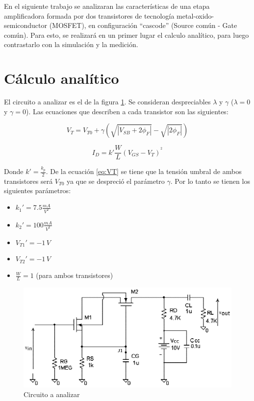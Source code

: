 \documentclass[10pt,spanish,a4paper,notitlepage]{article}
\begin{document}
En el siguiente trabajo se analizaran las características de una etapa amplificadora formada por dos transistores de tecnología metal-oxido-semiconductor (MOSFET), en configuración ``cascode'' (Source común - Gate común). Para esto, se realizará en un primer lugar el calculo analítico, para luego contrastarlo con la simulación y la medición.

\section{Cálculo analítico}

El circuito a analizar es el de la figura \ref{fig:circuitototal}. Se consideran despreciables $\lambda$ y $\gamma$ ($\lambda = 0$ y $\gamma = 0$). Las ecuaciones que describen a cada transistor son las siguientes:

\begin{equation}
     V_T=V_{T0}+\gamma \left( \sqrt{ | V_{SB}+2\phi_{F} | } - \sqrt{|2\phi_{F}|} \right)
    \label{eq:VT}
\end{equation}

\begin{equation}
    I_D={k}' \frac{W}{L} \left ( V_{GS}-V_{T} \right )^{^{2}}
    \label{eq:ID}
\end{equation}

Donde ${k}'=\frac{k_p}{2}$. De la ecuación \ref{eq:VT} se tiene que la tensión umbral de ambos transistores será $V_{T0}$ ya que se despreció el parámetro $\gamma$. Por lo tanto se tienen los siguientes parámetros:

\begin{itemize}
\item ${k_1}'=7.5\unit{\frac{mA}{V^2}}$
\item ${k_2}'=100\unit{\frac{mA}{V^2}}$
\item ${V_{T1}}'= -1\,\unit{V}$
\item ${V_{T2}}'= -1\,\unit{V}$
\item $\frac{W}{L}=1$ (para ambos transistores)
\end{itemize}

\begin{figure}[H]
\centering
\includegraphics[scale=1]{circuitos/circuitototal.png}
\caption{Circuito a analizar}
\label{fig:circuitototal}
\end{figure}
\end{document}
